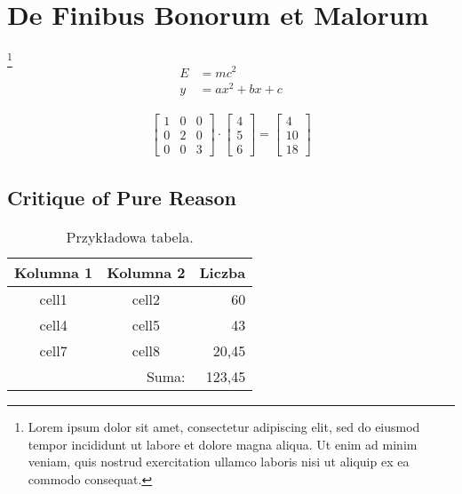 
\section{De Finibus Bonorum et Malorum}
\lipsum[1]\footnote{Lorem ipsum dolor sit amet, consectetur adipiscing elit, sed do eiusmod tempor incididunt ut labore et dolore magna aliqua. Ut enim ad minim veniam, quis nostrud exercitation ullamco laboris nisi ut aliquip ex ea commodo consequat. }
\begin{align*}
	E & = mc^2 \\ 
	y & = ax^2 + bx + c
\end{align*}

\lipsum[3]
\begin{align}
\begin{bmatrix}
1 & 0 & 0 \\ 
0 & 2 & 0 \\ 
0 & 0 & 3
\end{bmatrix} \cdot 
\begin{bmatrix}
4 \\ 5 \\ 6
\end{bmatrix} = 
\begin{bmatrix}
4 \\ 10 \\ 18
\end{bmatrix}
\end{align}

\lipsum[4] \cite{goossens93}

\subsection{Critique of Pure Reason}
\kant[1]

\begin{table}[!h] \label{tab:tabela1} \centering
\caption{Przykładowa tabela.}
\begin{tabular} {| c | c | r |} \hline
	Kolumna 1 & Kolumna 2 & Liczba \\ \hline\hline
	cell1 & cell2 & 60 \\ \hline
	cell4 & cell5 & 43 \\ \hline
	cell7 & cell8 & 20,45 \\ \hline
	\multicolumn{2}{|r|}{Suma:} & 123,45 \\ \hline
\end{tabular}
\end{table}

\kant[2]

